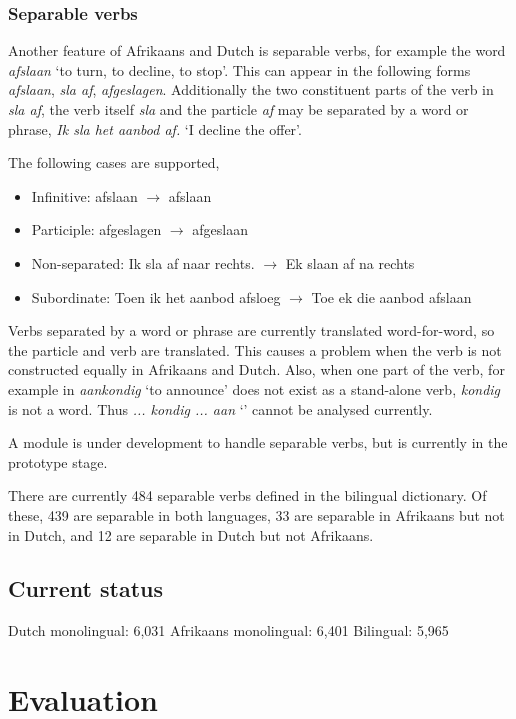\documentclass[11pt]{article}
\begin{document}
\subsubsection{Separable verbs}

Another feature of Afrikaans and Dutch is separable verbs, for example
the word {\em afslaan} `to turn, to decline, to stop'. This can appear in the following
forms {\em afslaan}, {\em sla af}, {\em afgeslagen}. Additionally the two constituent
parts of the verb in {\em sla af}, the verb itself {\em sla} and the particle
{\em af} may be separated by a word or phrase, {\em Ik sla het aanbod af.}
 `I decline the offer'.

The following cases are supported,

\begin{itemize}
\item Infinitive: afslaan $\rightarrow$ afslaan 
\item Participle: afgeslagen $\rightarrow$ afgeslaan
\item Non-separated: Ik sla af naar rechts. $\rightarrow$ Ek slaan af na rechts
\item Subordinate: Toen ik het aanbod afsloeg $\rightarrow$ Toe ek die aanbod afslaan
\end{itemize}

Verbs separated by a word or phrase are currently translated word-for-word,
so the particle and verb are translated. This causes a problem when the
verb is not constructed equally in Afrikaans and Dutch. Also, when one part
of the verb, for example in {\em aankondig} `to announce' does not exist as
a stand-alone verb, {\em kondig} is not a word. Thus {\em ... kondig ... aan} `'
cannot be analysed currently.

A module is under development to handle separable verbs, but is currently
in the prototype stage.

There are currently 484 separable verbs defined in the bilingual
dictionary. Of these, 439 are separable in both languages, 33 are
separable in Afrikaans but not in Dutch, and 12 are separable in
Dutch but not Afrikaans.

\subsection{Current status}

Dutch monolingual: 6,031
Afrikaans monolingual: 6,401
Bilingual: 5,965

\section{Evaluation}
\end{document}
